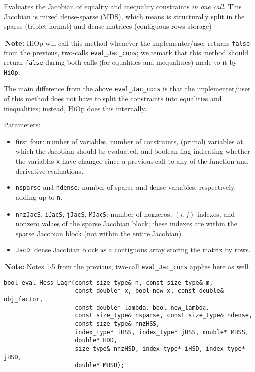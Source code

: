 \documentclass[11pt]{article}
\newcommand{\warningSymbol}{\raisebox{0.9\depth}{\danger}}
\newcommand{\warningcp}[1]{%
        \smallskip \noindent \textcolor{warningColorText}{\warningSymbol{}}\,\textbf{#1} %
    }
\newcommand{\Hi}{\texttt{HiOp}\xspace}
\begin{document}
\noindent Evaluates the Jacobian of equality and inequality constraints \textit{in one call}. This Jacobian is mixed dense-sparse (MDS), which means is structurally split in the sparse (triplet format) and dense matrices (contiguous rows storage)
   
\warningcp{Note:}   HiOp will call this method whenever the implementer/user returns \texttt{false} from the previous, two-calls \texttt{eval\_Jac\_cons}; we remark that this method should return  \texttt{false} during both calls (for equalities and inequalities) made to it by \Hi.
   
   
   
The main difference from the above \texttt{eval\_Jac\_cons} is that the implementer/user of this 
    method does not have to split the constraints into equalities and inequalities; instead,
    HiOp does this internally.
   
 
   Parameters:
    \begin{itemize}
    \item  first four: number of variables, number of constraints, (primal) variables at which the
    Jacobian should be evaluated, and boolean flag indicating whether the variables \texttt{x} have
    changed since a previous call to any of the function and derivative evaluations.
    \item   \texttt{nsparse} and \texttt{ndense}: number of sparse and dense variables, respectively, adding up to \texttt{n}.
     \item   \texttt{nnzJacS}, \texttt{iJacS}, \texttt{jJacS}, \texttt{MJacS}: number of nonzeros, $(i,j)$ indexes, and nonzero values of 
   the sparse Jacobian block; these indexes are within the sparse Jacobian block (not within 
    the entire Jacobian).
     \item  \texttt{JacD}: dense Jacobian block as a contiguous array storing the matrix by rows.
    \end{itemize}
   
\warningcp{Note:} Notes 1-5 from the previous, two-call \texttt{eval\_Jac\_cons} applies here as well.
    
\begin{lstlisting} 
bool eval_Hess_Lagr(const size_type& n, const size_type& m, 
                    const double* x, bool new_x, const double& obj_factor,
                    const double* lambda, bool new_lambda,
                    const size_type& nsparse, const size_type& ndense, 
                    const size_type& nnzHSS,
                    index_type* iHSS, index_type* jHSS, double* MHSS, 
                    double* HDD,
                    size_type& nnzHSD, index_type* iHSD, index_type* jHSD,
                    double* MHSD);
\end{lstlisting} 
\end{document}
